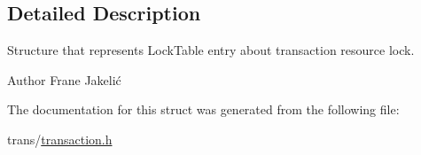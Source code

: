 \subsection{Detailed Description}
Structure that represents Lock\+Table entry about transaction resource lock. 

\begin{DoxyAuthor}{Author}
Frane Jakelić 
\end{DoxyAuthor}


The documentation for this struct was generated from the following file\+:\begin{DoxyCompactItemize}
\item 
trans/\hyperlink{transaction_8h}{transaction.\+h}\end{DoxyCompactItemize}
